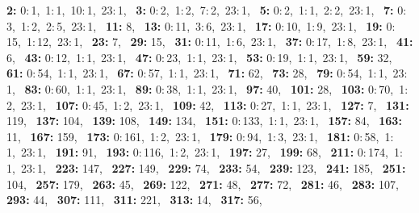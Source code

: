 \textbf{2:} 0:\,1,\ 1:\,1,\ 10:\,1,\ 23:\,1,\allowbreak~ 
\textbf{3:} 0:\,2,\ 1:\,2,\ 7:\,2,\ 23:\,1,\allowbreak~ 
\textbf{5:} 0:\,2,\ 1:\,1,\ 2:\,2,\ 23:\,1,\allowbreak~ 
\textbf{7:} 0:\,3,\ 1:\,2,\ 2:\,5,\ 23:\,1,\allowbreak~ 
\textbf{11:} 8,\allowbreak~ 
\textbf{13:} 0:\,11,\ 3:\,6,\ 23:\,1,\allowbreak~ 
\textbf{17:} 0:\,10,\ 1:\,9,\ 23:\,1,\allowbreak~ 
\textbf{19:} 0:\,15,\ 1:\,12,\ 23:\,1,\allowbreak~ 
\textbf{23:} 7,\allowbreak~ 
\textbf{29:} 15,\allowbreak~ 
\textbf{31:} 0:\,11,\ 1:\,6,\ 23:\,1,\allowbreak~ 
\textbf{37:} 0:\,17,\ 1:\,8,\ 23:\,1,\allowbreak~ 
\textbf{41:} 6,\allowbreak~ 
\textbf{43:} 0:\,12,\ 1:\,1,\ 23:\,1,\allowbreak~ 
\textbf{47:} 0:\,23,\ 1:\,1,\ 23:\,1,\allowbreak~ 
\textbf{53:} 0:\,19,\ 1:\,1,\ 23:\,1,\allowbreak~ 
\textbf{59:} 32,\allowbreak~ 
\textbf{61:} 0:\,54,\ 1:\,1,\ 23:\,1,\allowbreak~ 
\textbf{67:} 0:\,57,\ 1:\,1,\ 23:\,1,\allowbreak~ 
\textbf{71:} 62,\allowbreak~ 
\textbf{73:} 28,\allowbreak~ 
\textbf{79:} 0:\,54,\ 1:\,1,\ 23:\,1,\allowbreak~ 
\textbf{83:} 0:\,60,\ 1:\,1,\ 23:\,1,\allowbreak~ 
\textbf{89:} 0:\,38,\ 1:\,1,\ 23:\,1,\allowbreak~ 
\textbf{97:} 40,\allowbreak~ 
\textbf{101:} 28,\allowbreak~ 
\textbf{103:} 0:\,70,\ 1:\,2,\ 23:\,1,\allowbreak~ 
\textbf{107:} 0:\,45,\ 1:\,2,\ 23:\,1,\allowbreak~ 
\textbf{109:} 42,\allowbreak~ 
\textbf{113:} 0:\,27,\ 1:\,1,\ 23:\,1,\allowbreak~ 
\textbf{127:} 7,\allowbreak~ 
\textbf{131:} 119,\allowbreak~ 
\textbf{137:} 104,\allowbreak~ 
\textbf{139:} 108,\allowbreak~ 
\textbf{149:} 134,\allowbreak~ 
\textbf{151:} 0:\,133,\ 1:\,1,\ 23:\,1,\allowbreak~ 
\textbf{157:} 84,\allowbreak~ 
\textbf{163:} 11,\allowbreak~ 
\textbf{167:} 159,\allowbreak~ 
\textbf{173:} 0:\,161,\ 1:\,2,\ 23:\,1,\allowbreak~ 
\textbf{179:} 0:\,94,\ 1:\,3,\ 23:\,1,\allowbreak~ 
\textbf{181:} 0:\,58,\ 1:\,1,\ 23:\,1,\allowbreak~ 
\textbf{191:} 91,\allowbreak~ 
\textbf{193:} 0:\,116,\ 1:\,2,\ 23:\,1,\allowbreak~ 
\textbf{197:} 27,\allowbreak~ 
\textbf{199:} 68,\allowbreak~ 
\textbf{211:} 0:\,174,\ 1:\,1,\ 23:\,1,\allowbreak~ 
\textbf{223:} 147,\allowbreak~ 
\textbf{227:} 149,\allowbreak~ 
\textbf{229:} 74,\allowbreak~ 
\textbf{233:} 54,\allowbreak~ 
\textbf{239:} 123,\allowbreak~ 
\textbf{241:} 185,\allowbreak~ 
\textbf{251:} 104,\allowbreak~ 
\textbf{257:} 179,\allowbreak~ 
\textbf{263:} 45,\allowbreak~ 
\textbf{269:} 122,\allowbreak~ 
\textbf{271:} 48,\allowbreak~ 
\textbf{277:} 72,\allowbreak~ 
\textbf{281:} 46,\allowbreak~ 
\textbf{283:} 107,\allowbreak~ 
\textbf{293:} 44,\allowbreak~ 
\textbf{307:} 111,\allowbreak~ 
\textbf{311:} 221,\allowbreak~ 
\textbf{313:} 14,\allowbreak~ 
\textbf{317:} 56,\allowbreak~ 
